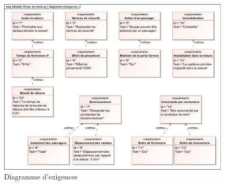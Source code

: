 \begin{figure}[!h]
 \centering\includegraphics[width=\linewidth]{img/exigences}
 \caption{Diagramme d'exigences}
 \label{fig0}
\end{figure}



